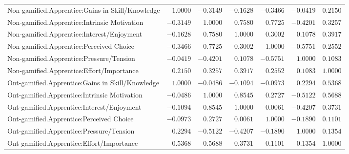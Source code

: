 \begin{landscape}
{\begin{longtable}{lrrrrrr}


Non-gamified.Apprentice:Gains in Skill/Knowledge&$ 1.0000$&$-0.3149$&$-0.1628$&$-0.3466$&$-0.0419$&$0.2150$\tabularnewline
Non-gamified.Apprentice:Intrinsic Motivation&$-0.3149$&$ 1.0000$&$ 0.7580$&$ 0.7725$&$-0.4201$&$0.3257$\tabularnewline
Non-gamified.Apprentice:Interest/Enjoyment&$-0.1628$&$ 0.7580$&$ 1.0000$&$ 0.3002$&$ 0.1078$&$0.3917$\tabularnewline
Non-gamified.Apprentice:Perceived Choice&$-0.3466$&$ 0.7725$&$ 0.3002$&$ 1.0000$&$-0.5751$&$0.2552$\tabularnewline
Non-gamified.Apprentice:Pressure/Tension&$-0.0419$&$-0.4201$&$ 0.1078$&$-0.5751$&$ 1.0000$&$0.1083$\tabularnewline
Non-gamified.Apprentice:Effort/Importance&$ 0.2150$&$ 0.3257$&$ 0.3917$&$ 0.2552$&$ 0.1083$&$1.0000$\tabularnewline
\hline

Ont-gamified.Apprentice:Gains in Skill/Knowledge&$ 1.0000$&$-0.0486$&$-0.1094$&$-0.0973$&$ 0.2294$&$0.5368$\tabularnewline
Ont-gamified.Apprentice:Intrinsic Motivation&$-0.0486$&$ 1.0000$&$ 0.8545$&$ 0.2727$&$-0.5122$&$0.5688$\tabularnewline
Ont-gamified.Apprentice:Interest/Enjoyment&$-0.1094$&$ 0.8545$&$ 1.0000$&$ 0.0061$&$-0.4207$&$0.3731$\tabularnewline
Ont-gamified.Apprentice:Perceived Choice&$-0.0973$&$ 0.2727$&$ 0.0061$&$ 1.0000$&$-0.1890$&$0.1101$\tabularnewline
Ont-gamified.Apprentice:Pressure/Tension&$ 0.2294$&$-0.5122$&$-0.4207$&$-0.1890$&$ 1.0000$&$0.1354$\tabularnewline
Ont-gamified.Apprentice:Effort/Importance&$ 0.5368$&$ 0.5688$&$ 0.3731$&$ 0.1101$&$ 0.1354$&$1.0000$\tabularnewline
\hline

\end{longtable}}\end{landscape}





